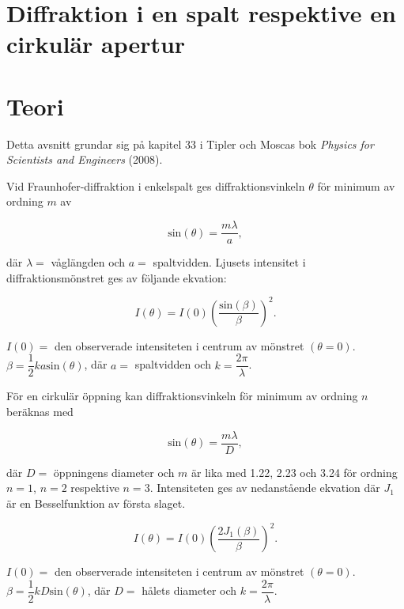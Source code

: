 \section*{\centering Diffraktion i en spalt respektive en cirkulär apertur}
\section{Teori}
Detta avsnitt grundar sig på kapitel 33 i Tipler och Moscas bok \textit{Physics for Scientists and Engineers} (2008).
\vspace{5mm}

Vid Fraunhofer-diffraktion i enkelspalt ges diffraktionsvinkeln $\theta$ för minimum av ordning $m$ av

\begin{equation}
    \text{sin}(\theta) = \dfrac{m\lambda}{a},
\end{equation}

där $\lambda =$ våglängden och $a =$ spaltvidden. Ljusets intensitet i diffraktionsmönstret ges av följande ekvation:

\begin{equation}
    I(\theta) = I(0) \left( \dfrac{\text{sin}(\beta)}{\beta} \right)^{2}.
\end{equation}

$I(0) =$ den observerade intensiteten i centrum av mönstret $(\theta = 0)$. \\
$\beta = \dfrac{1}{2} k a \text{sin}(\theta)$, där $a =$ spaltvidden och $k = \dfrac{2\pi}{\lambda}$.
\vspace{5mm}

För en cirkulär öppning kan diffraktionsvinkeln för minimum av ordning $n$ beräknas med

\begin{equation}
    \text{sin}(\theta) = \dfrac{m\lambda}{D},
\end{equation}

där $D =$ öppningens diameter och $m$ är lika med 1.22, 2.23 och 3.24 för ordning $n=1$, $n=2$ respektive $n=3$. Intensiteten ges av nedanstående ekvation där $J_{1}$ är en Besselfunktion av första slaget.

\begin{equation}
    I(\theta) = I(0) \left( \dfrac{2J_{1}(\beta)}{\beta} \right)^{2}.
\end{equation}

$I(0) =$ den observerade intensiteten i centrum av mönstret $(\theta = 0)$. \\
$\beta = \dfrac{1}{2} k D \text{sin}(\theta)$, där $D =$ hålets diameter och $k = \dfrac{2\pi}{\lambda}$.

